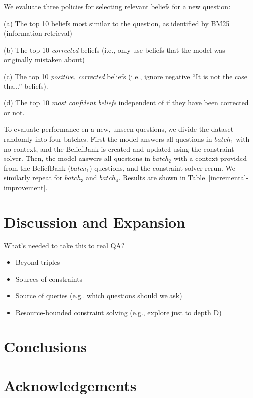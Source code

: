 \documentclass[11pt]{article}
\newenvironment{ite}{                     %
     \parskip 0cm \begin{itemize} \parskip 0cm \parsep 0cm \itemsep 0cm \topsep 0cm}{
        \end{itemize}} %
\newenvironment{des}{                 %
     \parskip 0cm \begin{list}{}{\parsep 0cm \itemsep 0cm \topsep 0cm}}{
       \end{list}} %
\begin{document}
We evaluate three policies for selecting relevant beliefs for a new question:
\begin{des}
\item[(a)] The top 10 beliefs most similar to the question, as identified by BM25 (information retrieval)
\item[(b)] The top 10 {\it corrected} beliefs (i.e., only use beliefs that the model was originally mistaken about)
\item[(c)] The top 10 {\it positive, corrected} beliefs (i.e., ignore negative ``It is not the case tha...'' beliefs).
\item[(d)] The top 10 {\it most confident beliefs} independent of if they have been corrected or not.
\end{des}


To evaluate performance on a new, unseen questions,
we divide the dataset randomly into four batches.
First the model answers all questions in $batch_1$ with no context, and the BeliefBank
is created and updated using the constraint solver. Then, the model answers all
questions in $batch_2$ with a context provided from the BeliefBank ($batch_1$) questions,
and the constraint solver rerun. We similarly repeat for $batch_3$ and $batch_4$.
Results are shown in Table~\ref{incremental-improvement}.

\section{Discussion and Expansion}

What's needed to take this to real QA? 
\begin{ite}
\item Beyond triples
\item Sources of constraints
\item Source of queries (e.g., which questions should we ask)
\item Resource-bounded constraint solving (e.g., explore just to depth D)
\end{ite}

\section{Conclusions}

\section*{Acknowledgements}




\end{document}
